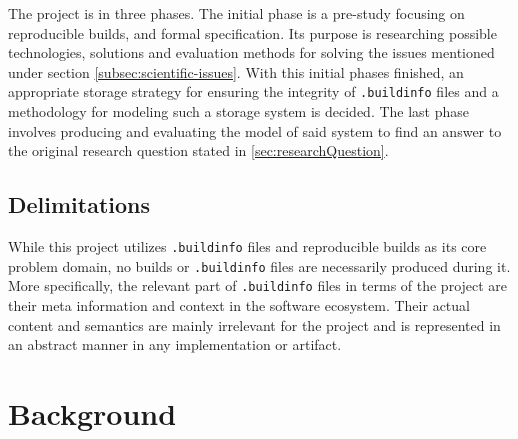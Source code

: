 \documentclass[english, biblatex, digitaloutput]{kththesis}
\begin{document}
The project is in three phases. The initial phase is a pre-study focusing on reproducible builds,  and formal specification. Its purpose is researching possible technologies, solutions and evaluation methods for solving the issues mentioned under section \ref{subsec:scientific-issues}. With this initial phases finished, an appropriate storage strategy for ensuring the integrity of \texttt{.buildinfo} files and a methodology for modeling such a storage system is decided. The last phase involves producing and evaluating the model of said system to find an answer to the original research question stated in \ref{sec:researchQuestion}.

\section{Delimitations}

While this project utilizes \texttt{.buildinfo} files and reproducible builds as its core problem domain, no builds or \texttt{.buildinfo} files are necessarily produced during it. More specifically, the relevant part of \texttt{.buildinfo} files in terms of the project are their meta information and context in the software ecosystem. Their actual content and semantics are mainly irrelevant for the project and is represented in an abstract manner in any implementation or artifact.


\cleardoublepage
\chapter{Background}
\label{ch:background}
\end{document}
